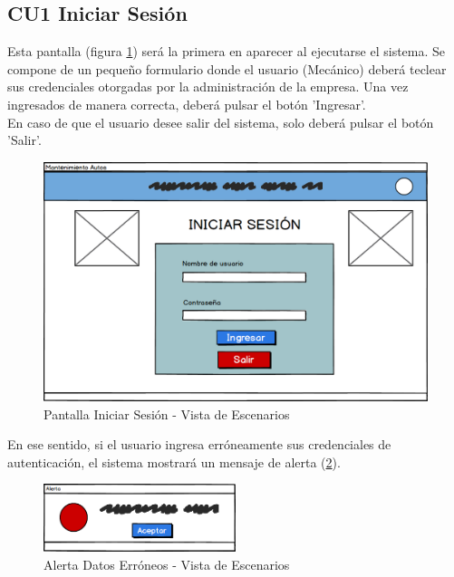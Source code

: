 \subsection{CU1 Iniciar Sesión}
Esta pantalla (figura \ref{fig:Pantalla Iniciar Sesion - Vista de Escenarios}) será la primera en aparecer al ejecutarse el sistema. Se compone de un pequeño formulario donde el usuario (Mecánico) deberá teclear sus credenciales otorgadas por la administración de la empresa. Una vez ingresados de manera correcta, deberá pulsar el botón 'Ingresar'.
\\
En caso de que el usuario desee salir del sistema, solo deberá pulsar el botón 'Salir'. 
\\

\begin{figure}[!h]
	\centering
	\includegraphics[width=1\textwidth]{./diseno/vescenarios/imagenes/Login}
	\caption{Pantalla Iniciar Sesión - Vista de Escenarios}
	\label{fig:Pantalla Iniciar Sesion - Vista de Escenarios}
\end{figure}
En ese sentido, si el usuario ingresa erróneamente sus credenciales de autenticación, el sistema mostrará un mensaje de alerta (\ref{fig:Alerta1 - Vista de Escenarios}).
\\
\begin{figure}[!h]
	\centering
	\includegraphics[width=0.5\textwidth]{./diseno/vescenarios/imagenes/alerta}
	\caption{Alerta Datos Erróneos - Vista de Escenarios}
	\label{fig:Alerta1 - Vista de Escenarios}
\end{figure}
\clearpage